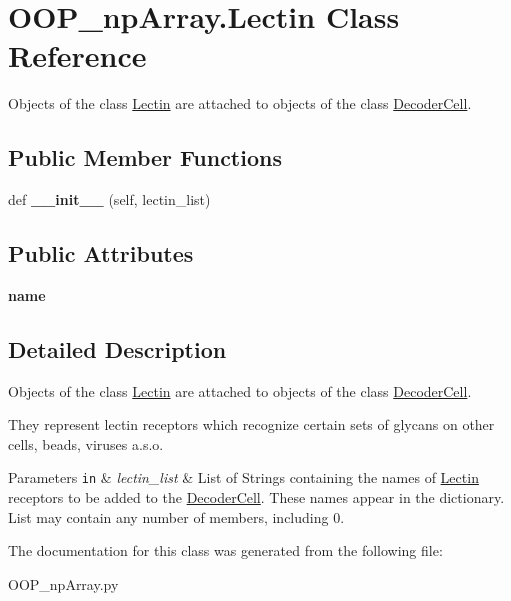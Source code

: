 \hypertarget{class_o_o_p__np_array_1_1_lectin}{}\section{O\+O\+P\+\_\+np\+Array.\+Lectin Class Reference}
\label{class_o_o_p__np_array_1_1_lectin}


Objects of the class \mbox{\hyperlink{class_o_o_p__np_array_1_1_lectin}{Lectin}} are attached to objects of the class \mbox{\hyperlink{class_o_o_p__np_array_1_1_decoder_cell}{Decoder\+Cell}}.  


\subsection*{Public Member Functions}
\begin{DoxyCompactItemize}
\item 
\mbox{\label{class_o_o_p__np_array_1_1_lectin_a6c63531d83a862fa9d3b089354a26f86}} 
def {\bfseries \+\_\+\+\_\+init\+\_\+\+\_\+} (self, lectin\+\_\+list)
\end{DoxyCompactItemize}
\subsection*{Public Attributes}
\begin{DoxyCompactItemize}
\item 
\mbox{\label{class_o_o_p__np_array_1_1_lectin_aedbfd75de0d5fcd2cda6bf05efc329ca}} 
{\bfseries name}
\end{DoxyCompactItemize}


\subsection{Detailed Description}
Objects of the class \mbox{\hyperlink{class_o_o_p__np_array_1_1_lectin}{Lectin}} are attached to objects of the class \mbox{\hyperlink{class_o_o_p__np_array_1_1_decoder_cell}{Decoder\+Cell}}. 

They represent lectin receptors which recognize certain sets of glycans on other cells, beads, viruses a.\+s.\+o.


\begin{DoxyParams}[1]{Parameters}
\mbox{\tt in}  & {\em lectin\+\_\+list} & List of Strings containing the names of \mbox{\hyperlink{class_o_o_p__np_array_1_1_lectin}{Lectin}} receptors to be added to the \mbox{\hyperlink{class_o_o_p__np_array_1_1_decoder_cell}{Decoder\+Cell}}. These names appear in the dictionary. List may contain any number of members, including 0. \\
\hline
\end{DoxyParams}


The documentation for this class was generated from the following file\+:\begin{DoxyCompactItemize}
\item 
O\+O\+P\+\_\+np\+Array.\+py\end{DoxyCompactItemize}
